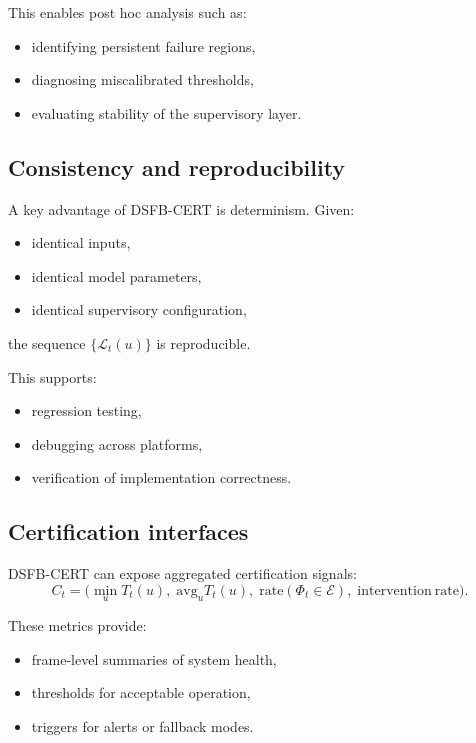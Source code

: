 \documentclass[11pt]{article}
\theoremstyle{definition}
\theoremstyle{plain}
\begin{document}
This enables post hoc analysis such as:
\begin{itemize}[leftmargin=1.5em]
    \item identifying persistent failure regions,
    \item diagnosing miscalibrated thresholds,
    \item evaluating stability of the supervisory layer.
\end{itemize}


\subsection{Consistency and reproducibility}

A key advantage of DSFB-CERT is determinism. Given:
\begin{itemize}[leftmargin=1.5em]
    \item identical inputs,
    \item identical model parameters,
    \item identical supervisory configuration,
\end{itemize}
the sequence $\{\mathcal{L}_t(u)\}$ is reproducible.

This supports:
\begin{itemize}[leftmargin=1.5em]
    \item regression testing,
    \item debugging across platforms,
    \item verification of implementation correctness.
\end{itemize}


\subsection{Certification interfaces}

DSFB-CERT can expose aggregated certification signals:
\begin{equation}
C_t = \bigl(
\min_u T_t(u),\;
\mathrm{avg}_u T_t(u),\;
\mathrm{rate}(\Phi_t\in\mathcal{E}),\;
\mathrm{intervention\ rate}
\bigr).
\end{equation}

These metrics provide:
\begin{itemize}[leftmargin=1.5em]
    \item frame-level summaries of system health,
    \item thresholds for acceptable operation,
    \item triggers for alerts or fallback modes.
\end{itemize}
\end{document}

